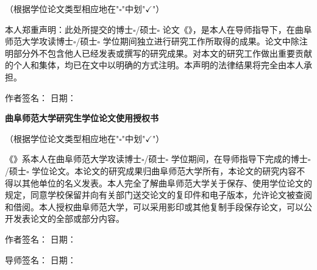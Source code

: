 {{    \centerline{（根据学位论文类型相应地在"$\square$"中划"$\checkmark$"）}
    
    本人郑重声明：此处所提交的博士$\square$/硕士$\square$ 论文《\sounder{\@title}》，是本人在导师指导下，在曲阜师范大学攻读博士$\square$/硕士$\square$ 学位期间独立进行研究工作所取得的成果。论文中除注明部分外不包含他人已经发表或撰写的研究成果。对本文的研究工作做出重要贡献的个人和集体，均已在文中以明确的方式注明。本声明的法律结果将完全由本人承担。
    
    \vspace{2em}
    作者签名：\hspace{6cm} 日期：\hspace{3cm}
    
    \vspace{4em}
    \centerline{{\songti\bfseries\linespread{1.0}\selectfont\spaceskip=1.42pt  %
    曲阜师范大学研究生学位论文使用授权书}}
    \vspace{1em}
    
    \centerline{（根据学位论文类型相应地在"$\square$"中划"$\checkmark$"）}
    
    《\sounder{\@title}》系本人在曲阜师范大学攻读博士$\square$/硕士$\square$ 学位期间，在导师指导下完成的博士$\square$/硕士$\square$ 学位论文。本论文的研究成果归曲阜师范大学所有，本论文的研究内容不得以其他单位的名义发表。本人完全了解曲阜师范大学关于保存、使用学位论文的规定，同意学校保留并向有关部门送交论文的复印件和电子版本，允许论文被查阅和借阅。本人授权曲阜师范大学，可以采用影印或其他复制手段保存论文，可以公开发表论文的全部或部分内容。
    
    \vspace{2em}
    作者签名：\hspace{6cm} 日期：\hspace{3cm}
    
    \vspace{1em}
    导师签名：\hspace{6cm} 日期：\hspace{3cm}
    }
}
\makeatother 

\AtBeginDocument{\makecover} 